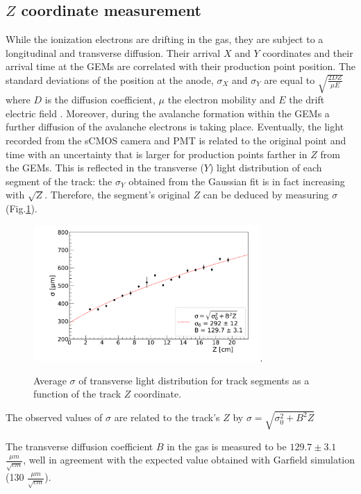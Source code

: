 \documentclass[%
 aip,
 amsmath,amssymb,
 reprint,%
]{revtex4-1}
\begin{document}
\subsection{$Z$ coordinate measurement}

 While the ionization electrons are drifting  in the gas, they are  subject to a longitudinal and transverse diffusion. Their arrival $X$ and $Y$ coordinates and their arrival time at the GEMs are correlated with  their  production point position. The standard deviations of the position at the anode, $\sigma_X$  and $\sigma_Y$ are equal to $\sqrt{\frac{2DZ}{\mu E}}$ where $D$ is the diffusion coefficient, $\mu$ the electron mobility and $E$ the drift electric field \cite{bib:rolandiblum}. Moreover, during the avalanche formation within the GEMs a further diffusion of the avalanche electrons is taking place. Eventually, the light recorded from the sCMOS camera and PMT is related to the original point and time with an uncertainty that is larger for  production points farther in $Z$ from the GEMs.
  This is reflected in the transverse ($Y$) light distribution of each segment of the track: the     $\sigma_Y$  obtained from  the  Gaussian fit is in fact increasing with $\sqrt{Z}$. Therefore,  the segment's original $Z$ can be deduced by measuring  $\sigma$(Fig.\ref{fig:Diffusion}).
  
  \begin{figure}[!ht]
\centering
\includegraphics[width=3.4in]{Fig9-Diffusion-Z.pdf}\DeclareGraphicsExtensions.
\caption{ Average $\sigma$ of transverse light distribution for track segments as a function of the track $Z $ coordinate. }
\label{fig:Diffusion}
\end{figure}

 The observed values of  $\sigma$  are related to the track's $Z$  by  $\sigma = \sqrt{\sigma_0^2 + B^2 Z }$ 
 
 The transverse  diffusion coefficient $B$ in the gas is measured to be $129.7 \pm 3.1$ $\frac{\mu m}{\sqrt{cm}}$,  well in agreement with the expected value obtained with Garfield simulation (130 $\frac{\mu m}{\sqrt{cm}}$).
\end{document}
